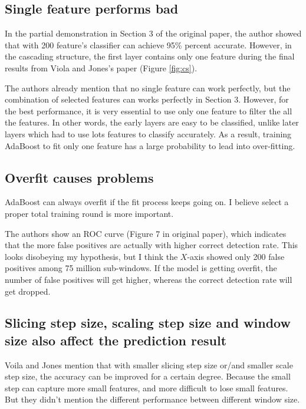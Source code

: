 \documentclass[10pt,twocolumn,letterpaper]{article}
\begin{document}



\subsection{Single feature performs bad}
In the partial demonstration in Section 3 of the original paper, the author showed that with 200 feature's classifier can achieve 95\% percent accurate.
However, in the cascading structure, the first layer contains only one feature during the final results from Viola and Jones's paper (Figure \ref{fig:cs}).

The authors already mention that no single feature can work perfectly, but the combination of selected features can works perfectly in Section 3.
However, for the best performance, it is very essential to use only one feature to filter the all the features.
In other words, the early layers are easy to be classified, unlike later layers which had to use lots features to classify accurately.
As a result, training AdaBoost to fit only one feature has a large probability to lead into over-fitting.

\subsection{Overfit causes problems}
AdaBoost can always overfit if the fit process keeps going on.
I believe select a proper total training round is more important.

The authors show an ROC curve (Figure 7 in original paper), which indicates that the more false positives are actually with higher correct detection rate.
This looks disobeying my hypothesis, but I think the $X$-axis showed only 200 false positives among 75 million sub-windows.
If the model is getting overfit, the number of false positives will get higher, whereas the correct detection rate will get dropped.

\subsection{Slicing step size, scaling step size and window size also affect the prediction result}
Voila and Jones mention that with smaller slicing step size or/and smaller scale step size, the accuracy can be improved for a certain degree.
Because the small step can capture more small features, and more difficult to lose small features.
But they didn't mention the different performance between different window size.
\end{document}
